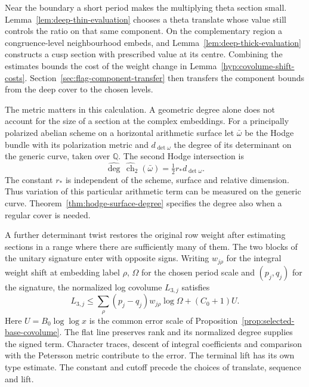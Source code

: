 Near the boundary a short period makes the multiplying theta section
small. Lemma~\ref{lem:deep-thin-evaluation} chooses a theta translate
whose value still controls the ratio on that same component.
On the complementary region a congruence-level neighbourhood embeds,
and Lemma~\ref{lem:deep-thick-evaluation} constructs a cusp section with
prescribed value at its centre. Combining the estimates bounds the
cost of the weight change in Lemma~\ref{hyp:covolume-shift-costs}.
Section~\ref{sec:flag-component-transfer} then transfers the component
bounds from the deep cover to the chosen levels.

The metric matters in this calculation. A geometric degree alone does not account for the size of a section at the complex embeddings. For a principally polarized abelian scheme on a horizontal arithmetic surface let \(\bar\omega\) be the Hodge bundle with its polarization metric and \(d_{\det\omega}\) the degree of its determinant on the generic curve, taken over \(\mathbb Q\). The second Hodge intersection is
\[
             \widehat{\deg}\,\widehat{\operatorname{ch}}_2(\bar\omega)
                            =\tfrac12 r_*d_{\det\omega}.
\]
The constant \(r_*\) is independent of the scheme, surface and relative dimension. Thus variation of this particular arithmetic term can be measured on the generic curve. Theorem~\ref{thm:hodge-surface-degree} specifies the degree also when a regular cover is needed.

A further determinant twist restores the original row weight after estimating sections in a range where there are sufficiently many of them. The two blocks of the unitary signature enter with opposite signs. Writing \(w_{j\rho}\) for the integral weight shift at embedding label \(\rho\), \(\Omega\) for the chosen period scale and \((p_j,q_j)\) for the signature, the normalized log covolume \(L_{3,j}\) satisfies
\[
          L_{3,j}\le \sum_\rho(p_j-q_j)w_{j\rho}\log\Omega+(C_0+1)U .
\]
Here \(U=B_0\log\log x\) is the common error scale of Proposition~\ref{prop:selected-base-covolume}. The flat line preserves rank and its normalized degree supplies the signed term. Character traces, descent of integral coefficients and comparison with the Petersson metric contribute to the error. The terminal lift has its own type estimate. The constant and cutoff precede the choices of translate, sequence and lift.

